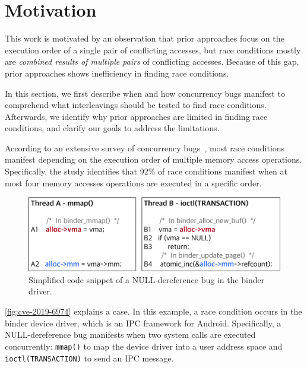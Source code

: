 \section{Motivation}
\label{ss:motivation}


This work is motivated by an observation that prior approaches
focus on the execution order of a single pair of conflicting
accesses, but race conditions mostly are \textit{combined results of multiple pairs} 
of conflicting accesses.
%
Because of this gap, prior approaches shows inefficiency in finding race
conditions.

In this section, we first describe when and how concurrency bugs
manifest to comprehend what interleavings should be tested to find
race conditions.
%
Afterwards, we identify why prior approaches are limited in finding
race conditions, and clarify our goals to address the limitations.


%
According to an extensive survey of concurrency
bugs~\cite{learningfrommistakes}, most race conditions manifest
depending on the execution order of multiple memory access operations.
%
Specifically, the study identifies that 92\% of race conditions manifest 
when at most four memory accesses operations are executed in a specific
order.
%

\begin{figure}[t]
  \centering
  \includegraphics[width=0.95\linewidth]{fig/cve-2017-10661.pdf}
  \caption{Simplified code snippet of a NULL-dereference bug in the
    binder driver.}
  \label{fig:cve-2019-6974}
\end{figure}

\autoref{fig:cve-2019-6974} explains a case. In this example, a race
condition occurs in the binder device driver, which is an IPC
framework for Android. Specifically, a NULL-dereference bug manifests
when two system calls are executed concurrently: \texttt{mmap()} to
map the device driver into a user address space and
\texttt{ioctl(TRANSACTION)} to send an IPC message.


